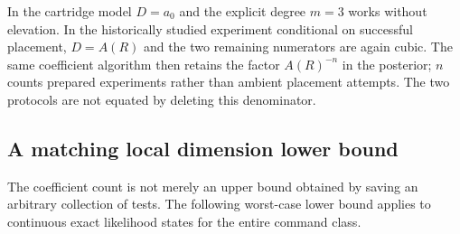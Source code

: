 In the cartridge model $D=a_0$ and the explicit degree $m=3$ works without
elevation. In the historically studied experiment conditional on successful
placement, $D=A(R)$ and the two remaining numerators are again cubic.
The same coefficient algorithm then retains the factor $A(R)^{-n}$ in the
posterior; $n$ counts prepared experiments rather than ambient placement
attempts. The two protocols are not equated by deleting this denominator.

\subsection{A matching local dimension lower bound}
The coefficient count is not merely an upper bound obtained by saving an
arbitrary collection of tests. The following worst-case lower bound applies
to continuous exact likelihood states for the entire command class.

